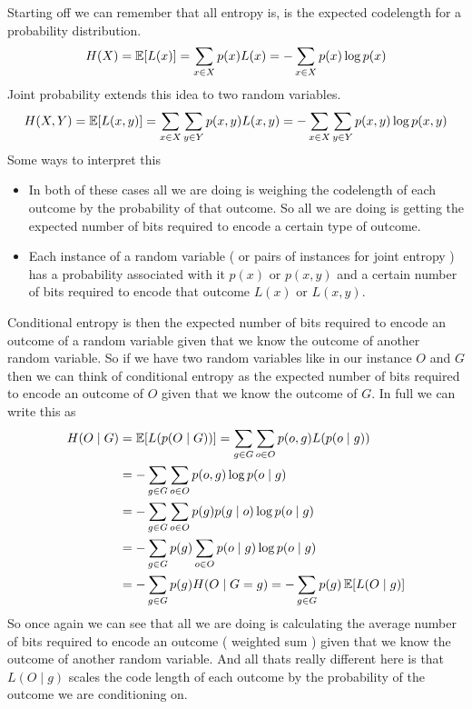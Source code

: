 \documentclass[12pt]{article}
\begin{document}
Starting off we can remember that all entropy is, is the expected codelength for a probability distribution.
\[
    H(X) = \operatorname{\mathbb{E}}[L(x)] = \sum_{x\in X}p(x)L(x) = -\sum_{x\in X}p(x)\log p(x)
\]
Joint probability extends this idea to two random variables.
\[
    H(X, Y) = \operatorname{\mathbb{E}}[L(x, y)] = \sum_{x\in X}\sum_{y\in Y}p(x, y)L(x, y) = -\sum_{x\in X}\sum_{y\in Y}p(x, y)\log p(x, y)
\]
Some ways to interpret this
\begin{itemize}[leftmargin=*, noitemsep]
    \item In both of these cases all we are doing is weighing the codelength of each outcome by the probability of that outcome. So all we are doing is getting the expected number of bits required to encode a certain type of outcome.
    \item Each instance of a random variable ( or pairs of instances for joint entropy ) has a probability associated with it $p(x)$ or $p(x, y)$ and a certain number of bits required to encode that outcome $L(x)$ or $L(x, y)$.
\end{itemize}

\smallskip
Conditional entropy is then the expected number of bits required to encode an outcome of a random variable given that we know the outcome of another random variable. So if we have two random variables like in our instance $O$ and $G$ then we can think of conditional entropy as the expected number of bits required to encode an outcome of $O$ given that we know the outcome of $G$. In full we can write this as
\begin{align*}
    H(O\mid G) & = \operatorname{\mathbb{E}}[L(p(O\mid G))] = \sum_{g\in G}\sum_{o\in O}p(o, g)L(p(o\mid g))                \\
               & = -\sum_{g\in G}\sum_{o\in O}p(o, g)\log p(o\mid g)                         \\
               & = -\sum_{g \in G}\sum_{o\in O}p(g)p(g\mid o)\log p(o\mid g)                  \\
               & = -\sum_{g\in G}p(g)\sum_{o\in O}p(o\mid g)\log p(o\mid g)                  \\
               & = -\sum_{g\in G}p(g)H(O\mid G = g) = -\sum_{g\in G}p(g)\operatorname{\mathbb{E}}[L(O\mid g)]
\end{align*}
So once again we can see that all we are doing is calculating the average number of bits required to encode an outcome ( weighted sum ) given that we know the outcome of another random variable. And all thats really different here is that $L(O\mid g)$ scales the code length of each outcome by the probability of the outcome we are conditioning on.
\end{document}

